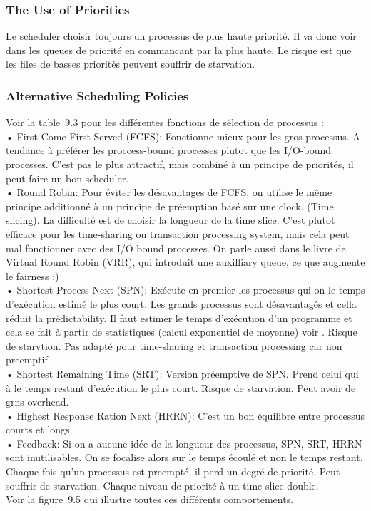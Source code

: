 \subsubsection{The Use of Priorities}
Le scheduler choisir toujours un processus de plus haute priorité.
Il va donc voir dans les queues de priorité en commancant par la plus haute.
Le risque est que les files de basses priorités peuvent souffrir de starvation.
\subsubsection{Alternative Scheduling Policies}
Voir la table~9.3 pour les différentes fonctions de sélection de processus :\\
• First-Come-First-Served (FCFS): Fonctionne mieux pour les gros processus.
A tendance à préférer les proccess-bound processes plutot que les I/O-bound processes.
C'est pas le plus attractif, mais combiné à un principe de priorités, il peut faire un bon scheduler.\\
• Round Robin: Pour éviter les désavantages de FCFS, on utilise le même principe additionné à un principe de préemption basé sur une clock.
(Time slicing).
La difficulté est de choisir la longueur de la time slice.
C'est plutot efficace pour les time-sharing ou transaction processing system, mais cela peut mal fonctionner avec des I/O bound processes.
On parle aussi dans le livre de Virtual Round Robin (VRR), qui introduit une auxilliary queue, ce que augmente le fairness :)\\
• Shortest Process Next (SPN): Exécute en premier les processus qui on le temps d'exécution estimé le plus court.
Les grands processus sont désavantagés et cella réduit la prédictability.
Il faut estimer le temps d'exécution d'un programme et cela se fait à partir de statistiques (calcul exponentiel de moyenne) voir \cite[p.~410-411]{stallings}.
Risque de starvtion.
Pas adapté pour time-sharing et transaction processing car non preemptif.\\
• Shortest Remaining Time (SRT): Version préemptive de SPN.
Prend celui qui à le temps restant d'exécution le plus court.
Risque de starvation.
Peut avoir de grns overhead.\\
• Highest Response Ration Next (HRRN): C'est un bon équilibre entre processus courts et longs.\\
• Feedback: Si on a aucune idée de la longueur des processus, SPN, SRT, HRRN sont inutilisables.
On se focalise alors sur le temps écoulé et non le temps restant.
Chaque fois qu'un processus est preempté, il perd un degré de priorité.
Peut souffrir de starvation.
Chaque niveau de priorité à un time slice double.\\
Voir la figure~9.5 \cite[p.~405]{stallings} qui illustre toutes ces différents comportements.
